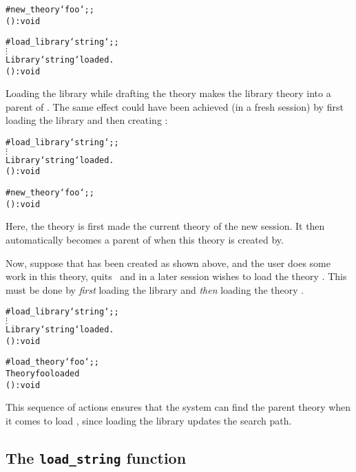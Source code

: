 \setcounter{sessioncount}{1}
\begin{session}\begin{alltt}
#new_theory `foo`;;
() : void

#load_library `string`;;
  \(\vdots\)
Library `string` loaded.
() : void
\end{alltt}\end{session}

\noindent Loading the library while drafting the theory  makes the
library theory  into a parent of .  The same effect could
have been achieved (in a fresh session) by first loading the library and then
creating :

\setcounter{sessioncount}{1}
\begin{session}\begin{alltt}
#load_library `string`;;
  \(\vdots\)
Library `string` loaded.
() : void

#new_theory `foo`;;
() : void
\end{alltt}\end{session}

\noindent Here, the theory  is first made the current theory of the
new session.  It then automatically becomes a parent of  when this
theory is created by\pagebreak[3] .

Now, suppose that  has been created as shown above, and the user does
some work in this theory, quits \HOL\, and in a later session wishes to load
the theory .  This must be done by {\it first\/} loading the
 library and {\it then\/} loading the theory .

\setcounter{sessioncount}{1}
\begin{session}\begin{alltt}
#load_library `string`;;
  \(\vdots\)
Library `string` loaded.
() : void

#load_theory `foo`;;
Theory foo loaded
() : void
\end{alltt}\end{session}

\noindent This sequence of actions ensures that the system can find the parent
theory  when it comes to load , since loading the library
updates the search path. 

\subsection{The {\tt load\_string} function}%

